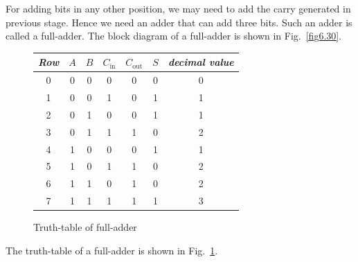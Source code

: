For adding bits in any other position, we may need to add the carry generated in previous stage. Hence we need an adder that can add three bits. Such an adder is called a full-adder. The block diagram of a full-adder is shown in Fig.~\ref{fig6.30}.
\begin{figure}[H]
\centering
\tabcolsep=6pt
\renewcommand{\arraystretch}{1.2}
\begin{tabular}{|c|ccc|cc|c|}
\hline
{\bf\em Row} & \boldmath$A$ & \boldmath$B$ & \boldmath$C_{\text{in}}$ & \boldmath$C_{\text{out}}$ & \boldmath$S$ & {\bf\em decimal value}\\
\hline
0 & 0 & 0 & 0 & 0 & 0 & 0\\
1 & 0 & 0 & 1 & 0 & 1 & 1\\
2 & 0 & 1 & 0 & 0 & 1 & 1\\
3 & 0 & 1 & 1 & 1 & 0 & 2\\
4 & 1 & 0 & 0 & 0 & 1 & 1\\
5 & 1 & 0 & 1 & 1 & 0 & 2\\
6 & 1 & 1 & 0 & 1 & 0 & 2\\
7 & 1 & 1 & 1 & 1 & 1 & 3\\
\hline
\end{tabular}
\caption{Truth-table of full-adder}\label{fig6.31}
\end{figure}

The truth-table of a full-adder is shown in Fig.~\ref{fig6.31}.

